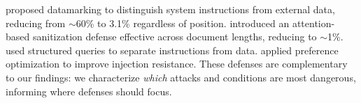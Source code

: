 \citet{hines2024spotlighting} proposed datamarking to distinguish system instructions from external data, reducing \asr from $\sim$60\% to 3.1\% regardless of position.
\citet{geng2025pisanitizer} introduced an attention-based sanitization defense effective across document lengths, reducing \asr to $\sim$1\%.
\citet{chen2024struq} used structured queries to separate instructions from data.
\citet{wu2024secalign} applied preference optimization to improve injection resistance.
These defenses are complementary to our findings: we characterize \emph{which} attacks and conditions are most dangerous, informing where defenses should focus.

